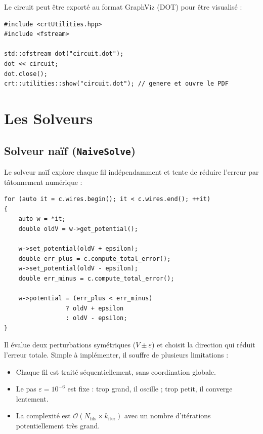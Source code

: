\documentclass[12pt,a4paper]{article}
\begin{document}
Le circuit peut être exporté au format GraphViz (DOT) pour être visualisé :

\begin{lstlisting}[caption={Export GraphViz}]
#include <crtUtilities.hpp>
#include <fstream>

std::ofstream dot("circuit.dot");
dot << circuit;
dot.close();
crt::utilities::show("circuit.dot"); // genere et ouvre le PDF
\end{lstlisting}

\section{Les Solveurs}

\subsection{Solveur naïf (\texttt{NaiveSolve})}

Le solveur naïf explore chaque fil indépendamment et tente de réduire l'erreur
par tâtonnement numérique :

\begin{lstlisting}[caption={Bouble principale du solveur naïf (crtSolver.hpp)}]
for (auto it = c.wires.begin(); it < c.wires.end(); ++it)
{
    auto w = *it;
    double oldV = w->get_potential();

    w->set_potential(oldV + epsilon);
    double err_plus = c.compute_total_error();
    w->set_potential(oldV - epsilon);
    double err_minus = c.compute_total_error();

    w->potential = (err_plus < err_minus)
                 ? oldV + epsilon
                 : oldV - epsilon;
}
\end{lstlisting}

Il évalue deux perturbations symétriques ($V \pm \varepsilon$) et choisit
la direction qui réduit l'erreur totale. Simple à implémenter, il souffre de
plusieurs limitations :
\begin{itemize}
  \item Chaque fil est traité séquentiellement, sans coordination globale.
  \item Le pas $\varepsilon = 10^{-6}$ est fixe : trop grand, il oscille ;
        trop petit, il converge lentement.
  \item La complexité est $\mathcal{O}(N_{\text{fils}} \times k_{\text{iter}})$
        avec un nombre d'itérations potentiellement très grand.
\end{itemize}
\end{document}
